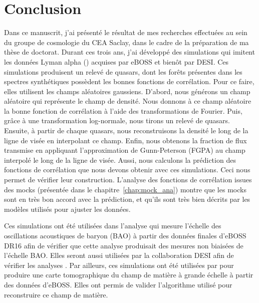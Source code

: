 \chapter*{Conclusion}

Dans ce manuscrit, j'ai présenté le résultat de mes recherches effectuées au sein du groupe de cosmologie du CEA Saclay, dans le cadre de la préparation de ma thèse de doctorat.
Durant ces trois ans, j'ai développé des simulations qui imitent les données Lyman alpha (\lya{}) acquises par eBOSS et bienôt par DESI.
Ces simulations produisent un relevé de quasars, dont les forêts \lya{} présentes dans les spectres synthétiques possèdent les bonnes fonctions de corrélation.
Pour ce faire, elles utilisent les champs aléatoires gaussiens. D'abord, nous générons un champ aléatoire qui représente le champ de densité. Nous donnons à ce champ aléatoire la bonne fonction de corrélation à l'aide des transformations de Fourier.
Puis, grâce à une transformation log-normale, nous tirons un relevé de quasars. Ensuite, à partir de chaque quasars, nous reconstruisons la densité le long de la ligne de visée en interpolant ce champ. Enfin, nous obtenons la fraction de flux transmise en appliquant l'approximation de Gunn-Peterson (FGPA) au champ interpolé le long de la ligne de visée.
Aussi, nous calculons la prédiction des fonctions de corrélation que nous devons obtenir avec ces simulations. Ceci nous permet de vérifier leur construction.
L'analyse des fonctions de corrélation issues des mocks (présentée dans le chapitre~\ref{chap:mock_ana}) montre que les mocks sont en très bon accord avec la prédiction, et qu'ils sont très bien décrits par les modèles utilisés pour ajuster les données.

Ces simulations ont été utilisées dans l'analyse qui mesure l'échelle des oscillations acoustiques de baryon (BAO) à partir des données finales d'eBOSS DR16 \autocite{DuMasdesBourboux2020} afin de vérifier que cette analyse produisait des mesures non biaisées de l'échelle BAO. Elles seront aussi utilisées par la collaboration DESI afin de vérifier les analyses \lya{}.
Par ailleurs, ces simulations ont été utilisées par \textcite{Ravoux2020} pour produire une carte tomographique du champ de matière à grande échelle à partir des données d'eBOSS. Elles ont permis de valider l'algorithme utilisé pour reconstruire ce champ de matière.

